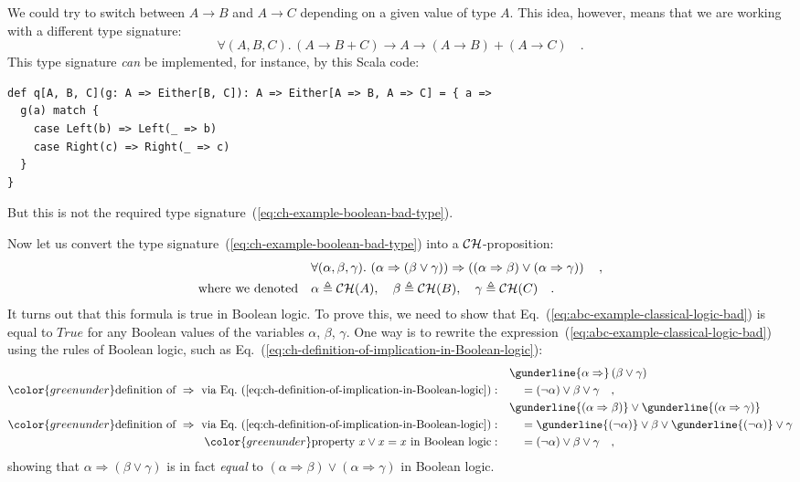 We could try to switch between $A\rightarrow B$ and $A\rightarrow C$
depending on a given value of type $A$. This idea, however, means
that we are working with a different type signature: 
\[
\forall(A,B,C).\,\left(A\rightarrow B+C\right)\rightarrow A\rightarrow\left(A\rightarrow B\right)+\left(A\rightarrow C\right)\quad.
\]
This type signature \emph{can} be implemented, for instance, by this
Scala code:
\begin{lstlisting}
def q[A, B, C](g: A => Either[B, C]): A => Either[A => B, A => C] = { a =>
  g(a) match {
    case Left(b) => Left(_ => b)
    case Right(c) => Right(_ => c)
  }
}
\end{lstlisting}
But this is not the required type signature~(\ref{eq:ch-example-boolean-bad-type}).

Now let us convert the type signature~(\ref{eq:ch-example-boolean-bad-type})
into a ${\cal CH}$-proposition:
\begin{align}
 & \forall(\alpha,\beta,\gamma).\,\left(\alpha\Rightarrow\left(\beta\vee\gamma\right)\right)\Rightarrow\left(\left(\alpha\Rightarrow\beta\right)\vee\left(\alpha\Rightarrow\gamma\right)\right)\quad,\label{eq:abc-example-classical-logic-bad}\\
\text{where we denoted}\quad & \alpha\triangleq{\cal CH}(A),\quad\beta\triangleq{\cal CH}(B),\quad\gamma\triangleq{\cal CH}(C)\quad.\nonumber 
\end{align}
It turns out that this formula is true in Boolean logic. To prove
this, we need to show that Eq.~(\ref{eq:abc-example-classical-logic-bad})
is equal to $True$ for any Boolean values of the variables $\alpha$,
$\beta$, $\gamma$. One way is to rewrite the expression~(\ref{eq:abc-example-classical-logic-bad})
using the rules of Boolean logic, such as Eq.~(\ref{eq:ch-definition-of-implication-in-Boolean-logic}):
\begin{align*}
 & \gunderline{\alpha\Rightarrow}\left(\beta\vee\gamma\right)\\
{\color{greenunder}\text{definition of }\Rightarrow\text{ via Eq.~(\ref{eq:ch-definition-of-implication-in-Boolean-logic})}:}\quad & \quad=(\neg\alpha)\vee\beta\vee\gamma\quad,\\
 & \gunderline{\left(\alpha\Rightarrow\beta\right)}\vee\gunderline{\left(\alpha\Rightarrow\gamma\right)}\\
{\color{greenunder}\text{definition of }\Rightarrow\text{ via Eq.~(\ref{eq:ch-definition-of-implication-in-Boolean-logic})}:}\quad & \quad=\gunderline{(\neg\alpha)}\vee\beta\vee\gunderline{(\neg\alpha)}\vee\gamma\\
{\color{greenunder}\text{property }x\vee x=x\text{ in Boolean logic}:}\quad & \quad=(\neg\alpha)\vee\beta\vee\gamma\quad,
\end{align*}
showing that $\alpha\Rightarrow(\beta\vee\gamma)$ is in fact \emph{equal}
to $\left(\alpha\Rightarrow\beta\right)\vee\left(\alpha\Rightarrow\gamma\right)$
in Boolean logic.

